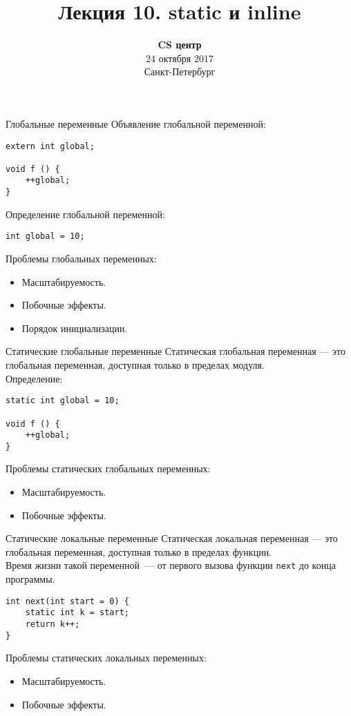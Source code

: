\documentclass{beamer}
\title{Лекция 10. static и inline}
\date{
   \textbf{CS центр}\\
   24 октября 2017 \\
   Санкт-Петербург
}
\begin{document}
\begin{frame} 
  \titlepage
\end{frame}

\begin{frame}[fragile]{Глобальные переменные}
Объявление глобальной переменной:
    \begin{lstlisting}
extern int global;

void f () {
    ++global; 
}
    \end{lstlisting}

Определение глобальной переменной:
    \begin{lstlisting}
int global = 10;
    \end{lstlisting}

Проблемы глобальных переменных:
\begin{itemize}
    \item Масштабируемость.
    \item Побочные эффекты.
    \item Порядок инициализации.
\end{itemize}
\end{frame}

\begin{frame}[fragile]{Статические глобальные переменные}
    Статическая глобальная переменная — это глобальная переменная,
    доступная только в пределах модуля.\\[1em]
Определение: 
    \begin{lstlisting}
static int global = 10;

void f () {
    ++global; 
}
    \end{lstlisting}
                
Проблемы статических глобальных переменных:
\begin{itemize}
    \item Масштабируемость.
    \item Побочные эффекты.
\end{itemize}
\end{frame}

\begin{frame}[fragile]{Статические локальные переменные}
    Статическая локальная переменная — это глобальная переменная,
    доступная только в пределах функции.\\[1em]
Время жизни такой переменной~--- от первого вызова функции {\tt next}
до конца программы.
    \begin{lstlisting}
int next(int start = 0) {
    static int k = start;
    return k++;
}
    \end{lstlisting}
                
Проблемы статических локальных переменных:
\begin{itemize}
    \item Масштабируемость.
    \item Побочные эффекты.
\end{itemize}
\end{frame}
\end{document}

